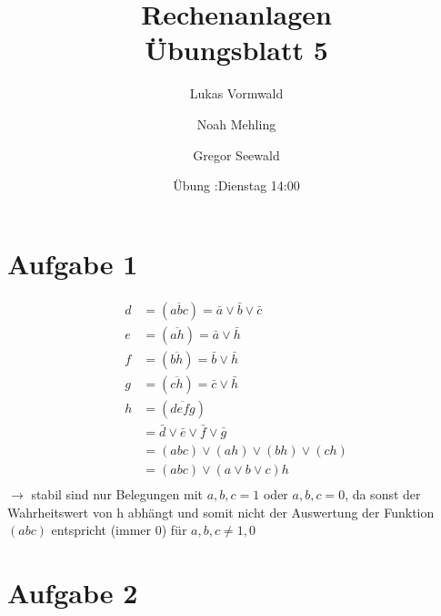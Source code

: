 \documentclass[11pt,a4paper]{article}
\title{Rechenanlagen\\Übungsblatt 5}
\author{Lukas Vormwald \and Noah Mehling \and Gregor Seewald}
\date{Übung :Dienstag 14:00}
\newcommand{\Aufgabe}[1]{\section{Aufgabe #1}}
\begin{document}
\maketitle

  \Aufgabe{1}

    \begin{align*}
      d&=\left(\overline{abc}\right)=\bar{a}\vee\bar{b}\vee\bar{c}\\
      e&=\left(\overline{ah}\right)=\bar{a}\vee\bar{h}\\
      f&=\left(\overline{bh}\right)=\bar{b}\vee\bar{h}\\
      g&=\left(\overline{ch}\right)=\bar{c}\vee\bar{h}\\
      h&=\left(\overline{defg}\right)\\
      &=\bar{d}\vee\bar{e}\vee\bar{f}\vee\bar{g}\\
      &=\left(abc\right)\vee\left(ah\right)\vee\left(bh\right)\vee\left(ch\right)\\
      &=\left(abc\right)\vee\left(a\vee b\vee c\right)h\\
    \end{align*}
    $\rightarrow$ stabil sind nur Belegungen mit $a,b,c=1$ oder $a,b,c=0$, da sonst der Wahrheitswert von h abhängt und somit nicht der Auswertung der Funktion $\left(abc\right)$ entspricht (immer $0$) für $a,b,c\neq 1,0$

  \Aufgabe{2}

    
    
\end{document}
